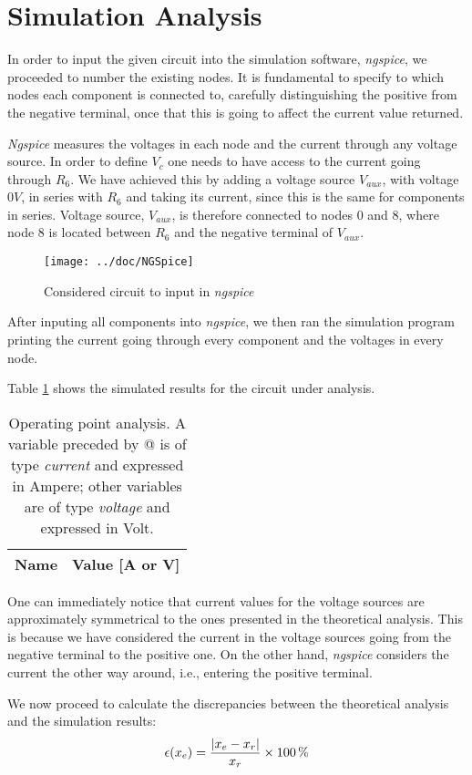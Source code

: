 \section{Simulation Analysis}
\label{sec:simulation}


In order to input the given circuit into the simulation software, \emph{ngspice}, we proceeded to number the existing nodes. It is fundamental to specify to which nodes each component is connected to, carefully distinguishing the positive from the negative terminal, once that this is going to affect the current value returned.

\emph{Ngspice} measures the voltages in each node and the current through any voltage source. In order to define $V_c$ one needs to have access to the current going through $R_6$. We have achieved this by adding a voltage source $V_{aux}$, with voltage $0V$, in series with $R_6$ and taking its current, since this is the same for components in series. Voltage source, $V_{aux}$, is therefore connected to nodes 0 and 8, where node 8 is located between $R_6$ and the negative terminal of $V_{aux}$.

\begin{figure}[H]
  \centering
  \texttt{[image: ../doc/NGSpice]}
  \caption{Considered circuit to input in \emph{ngspice}}
  \label{fig:fignodos}
\end{figure}

After inputing all components into \emph{ngspice}, we then ran the simulation program printing the current going through every component and the voltages in every node.


Table \ref{tab:ngspice} shows the simulated results for the circuit
under analysis.

\begin{table}[H]
  \centering
  \begin{tabular}{|l|r|}
    \hline
    {\bf Name} & {\bf Value [A or V]} \\ \hline
  \end{tabular}
  \caption{Operating point analysis. A variable preceded by @ is of type {\em current}
    and expressed in Ampere; other variables are of type {\it voltage} and expressed in
    Volt.}
  \label{tab:ngspice}
\end{table}

One can immediately notice that current values for the voltage sources are approximately symmetrical to the ones presented in the theoretical analysis. This is because we have considered the current in the voltage sources going from the negative terminal to the positive one. On the other hand, \emph{ngspice} considers the current the other way around, i.e., entering the positive terminal.
\par
We now proceed to calculate the discrepancies between the theoretical analysis and the simulation results:
\begin{equation}
  \centering
  \epsilon (x_e)=\frac{|x_e-x_r|}{x_r} \times 100\,\%
  \label{eq:error}
\end{equation}

